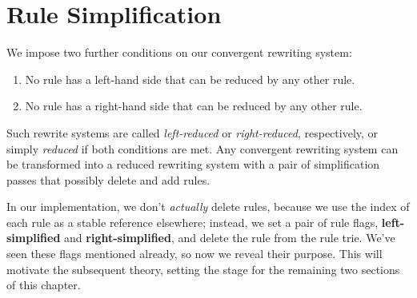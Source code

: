 \documentclass[../generics]{subfiles}
\begin{document}
\newcommand{\FourLoopDerived}[8]{%
\begin{tikzcd}[ampersand replacement=\&,column sep=1em]%
\&#1\arrow[ld, Rightarrow, "#5"', bend right]\&\\
#2\arrow[rd, Rightarrow, "#6"', bend right, dashed]\&\&#4\arrow[lu, Rightarrow,"#8"', bend right]\\
\&#3\arrow[ru, Rightarrow, "#7"', bend right]\&
\end{tikzcd}}
\newcommand{\FourLoopDerivedOther}[8]{%
\begin{tikzcd}[ampersand replacement=\&,column sep=1em]%
\&#1\arrow[ld, Rightarrow, "#5"', bend right]\&\\
#2\arrow[rd, Rightarrow, "#6"', bend right]\&\&#4\arrow[lu, Rightarrow,"#8"', bend right]\\
\&#3\arrow[ru, Rightarrow, "#7"', bend right, dashed]\&
\end{tikzcd}}
\newcommand{\FourLoopTrivial}[8]{%
\begin{tikzcd}[ampersand replacement=\&,column sep=1em]%
\&#1\arrow[ld, Rightarrow, "#5"', bend right]\&\\
#2\arrow[rd, Rightarrow, "#6"', bend right]\&\&#4\arrow[lu, Rightarrow,"#8"', bend right]\\
\&#3\arrow[ru, Rightarrow, "#7"', bend right]\&
\end{tikzcd}}

\section{Rule Simplification}\label{rule reduction}

We impose two further conditions on our convergent rewriting system:
\begin{enumerate}
\item No rule has a left-hand side that can be reduced by any other rule.
\item No rule has a right-hand side that can be reduced by any other rule.
\end{enumerate}
Such rewrite systems are called \emph{left-reduced} or \emph{right-reduced}, respectively, or simply \emph{reduced} if both conditions are met. Any convergent rewriting system can be transformed into a reduced rewriting system with a pair of simplification passes that possibly delete and add rules.

In our implementation, we don't \emph{actually} delete rules, because we use the index of each rule as a stable reference elsewhere; instead, we set a pair of rule flags, \textbf{left-simplified} and \textbf{right-simplified}, and delete the rule from the rule trie. We've seen these flags mentioned already, so now we reveal their purpose. This will motivate the subsequent theory, setting the stage for the remaining two sections of this chapter.
\end{document}
